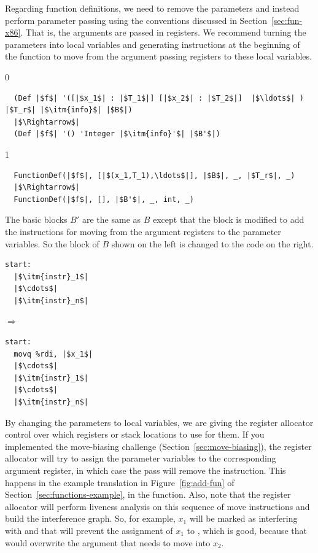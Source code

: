 \documentclass[7x10]{TimesAPriori_MIT}%
\def\racketEd{0}
\def\pythonEd{1}
\def\edition{1}
\begin{document}
Regarding function definitions, we need to remove the parameters and
instead perform parameter passing using the conventions discussed in
Section~\ref{sec:fun-x86}. That is, the arguments are passed in
registers. We recommend turning the parameters into local variables
and generating instructions at the beginning of the function to move
from the argument passing registers to these local variables.
{\if\edition\racketEd
\begin{lstlisting}
  (Def |$f$| '([|$x_1$| : |$T_1$|] [|$x_2$| : |$T_2$|]  |$\ldots$| ) |$T_r$| |$\itm{info}$| |$B$|)
  |$\Rightarrow$|
  (Def |$f$| '() 'Integer |$\itm{info}'$| |$B'$|)
\end{lstlisting}
\fi}
{\if\edition\pythonEd
\begin{lstlisting}
  FunctionDef(|$f$|, [|$(x_1,T_1),\ldots$|], |$B$|, _, |$T_r$|, _)
  |$\Rightarrow$|
  FunctionDef(|$f$|, [], |$B'$|, _, int, _)
\end{lstlisting}
\fi}
The basic blocks $B'$ are the same as $B$ except that the
 block is modified to add the instructions for moving from
the argument registers to the parameter variables. So the 
block of $B$ shown on the left is changed to the code on the right.
\begin{center}
\begin{minipage}{0.3\textwidth}
\begin{lstlisting}
start:
  |$\itm{instr}_1$|
  |$\cdots$|
  |$\itm{instr}_n$|
\end{lstlisting}
\end{minipage}
$\Rightarrow$
\begin{minipage}{0.3\textwidth}
\begin{lstlisting}
start:
  movq %rdi, |$x_1$|
  |$\cdots$|
  |$\itm{instr}_1$|
  |$\cdots$|
  |$\itm{instr}_n$|
\end{lstlisting}
\end{minipage}
\end{center}
By changing the parameters to local variables, we are giving the
register allocator control over which registers or stack locations to
use for them. If you implemented the move-biasing challenge
(Section~\ref{sec:move-biasing}), the register allocator will try to
assign the parameter variables to the corresponding argument register,
in which case the  pass will remove the
 instruction. This happens in the example translation in
Figure~\ref{fig:add-fun} of Section~\ref{sec:functions-example}, in
the  function.
%
Also, note that the register allocator will perform liveness analysis
on this sequence of move instructions and build the interference
graph. So, for example, $x_1$ will be marked as interfering with
 and that will prevent the assignment of $x_1$ to
, which is good, because that would overwrite the argument
that needs to move into $x_2$.
\end{document}
